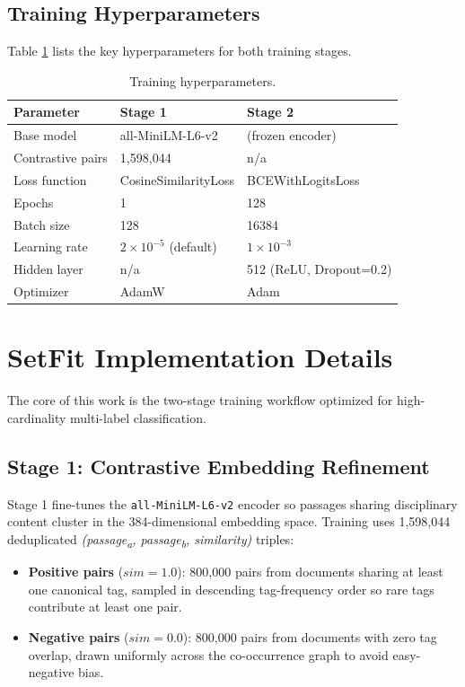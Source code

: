 \documentclass[10pt,journal,compsoc]{IEEEtran}
\newcommand{\ContrastivePairs}{1,598,044}
\newcommand{\PosPairs}{800,000}
\newcommand{\NegPairs}{800,000}
\newcommand{\StageOneEpochs}{1}
\newcommand{\StageOneBatch}{128}
\newcommand{\StageOneLR}{2\times10^{-5}}
\newcommand{\StageTwoEpochs}{128}
\newcommand{\StageTwoBatch}{16384}
\newcommand{\StageTwoLR}{1\times10^{-3}}
\newcommand{\MLPHiddenDim}{512}
\newcommand{\MLPDropout}{0.2}
\newcommand{\EncoderDim}{384}
\begin{document}
	\subsection{Training Hyperparameters}
	Table \ref{tab:hyperparams} lists the key hyperparameters for both training stages.
	
	\begin{table}[htbp]
		\centering
		\caption{Training hyperparameters.}
		\label{tab:hyperparams}
		\begin{tabular}{@{}lll@{}}
			\toprule
			\textbf{Parameter} & \textbf{Stage 1} & \textbf{Stage 2} \\
			\midrule
			Base model & all-MiniLM-L6-v2 & (frozen encoder) \\
			Contrastive pairs & \ContrastivePairs{} & n/a \\
			Loss function & CosineSimilarityLoss & BCEWithLogitsLoss \\
			Epochs & \StageOneEpochs{} & \StageTwoEpochs{} \\
			Batch size & \StageOneBatch{} & \StageTwoBatch{} \\
			Learning rate & $\StageOneLR$ (default) & $\StageTwoLR$ \\
			Hidden layer & n/a & \MLPHiddenDim{} (ReLU, Dropout=\MLPDropout{}) \\
			Optimizer & AdamW & Adam \\
			\bottomrule
		\end{tabular}
	\end{table}
	
	\section{SetFit Implementation Details}
	The core of this work is the two-stage training workflow optimized for high-cardinality multi-label classification.
	
	\subsection{Stage 1: Contrastive Embedding Refinement}
	Stage 1 fine-tunes the \texttt{all-MiniLM-L6-v2} encoder so passages sharing
	disciplinary content cluster in the \EncoderDim{}-dimensional embedding space.
	Training uses \ContrastivePairs{} deduplicated
	\emph{(passage\textsubscript{a}, passage\textsubscript{b}, similarity)} triples:
	
	\begin{itemize}
		\item \textbf{Positive pairs} ($sim=1.0$): \PosPairs{} pairs from documents
		sharing at least one canonical tag, sampled in descending tag-frequency order
		so rare tags contribute at least one pair.
		\item \textbf{Negative pairs} ($sim=0.0$): \NegPairs{} pairs from documents
		with zero tag overlap, drawn uniformly across the co-occurrence graph to
		avoid easy-negative bias.
	\end{itemize}
	
\end{document}
